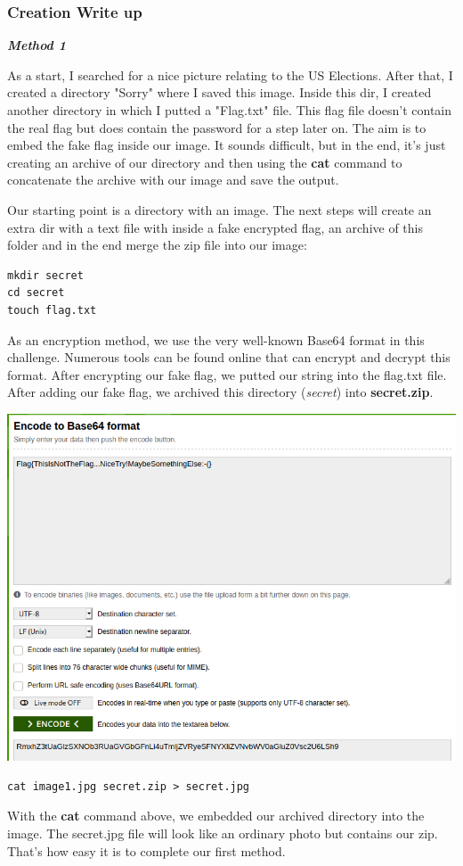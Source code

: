\documentclass[../main.tex]{subfiles}
\begin{document}
\subsubsection{Creation Write up}

\textbf{\textit{Method 1}}

As a start, I searched for a nice picture relating to the US Elections. After that, I created a directory "Sorry" where I saved this image. Inside this dir, I created another directory in which I putted a "Flag.txt" file. This flag file doesn't contain the real flag but does contain the password for a step later on. The aim is to embed the fake flag inside our image. It sounds difficult, but in the end, it's just creating an archive of our directory and then using the \textbf{cat} command to concatenate the archive with our image and save the output.

Our starting point is a directory with an image. The next steps will create an extra dir with a text file with inside a fake encrypted flag, an archive of this folder and in the end merge the zip file into our image:
\begin{lstlisting}
mkdir secret
cd secret
touch flag.txt
\end{lstlisting}

As an encryption method, we use the very well-known Base64 format in this challenge. Numerous tools can be found online that can encrypt and decrypt this format. After encrypting our fake flag, we putted our string into the flag.txt file. After adding our fake flag, we archived this directory (\textit{secret}) into \textbf{secret.zip}.
\begin{center}
\includegraphics[width=1\linewidth]{images/Robbe/sorry1.png}
\end{center}
\begin{lstlisting}
cat image1.jpg secret.zip > secret.jpg
\end{lstlisting}
With the \textbf{cat} command above, we embedded our archived directory into the image. The secret.jpg file will look like an ordinary photo but contains our zip. That's how easy it is to complete our first method.
\end{document}
